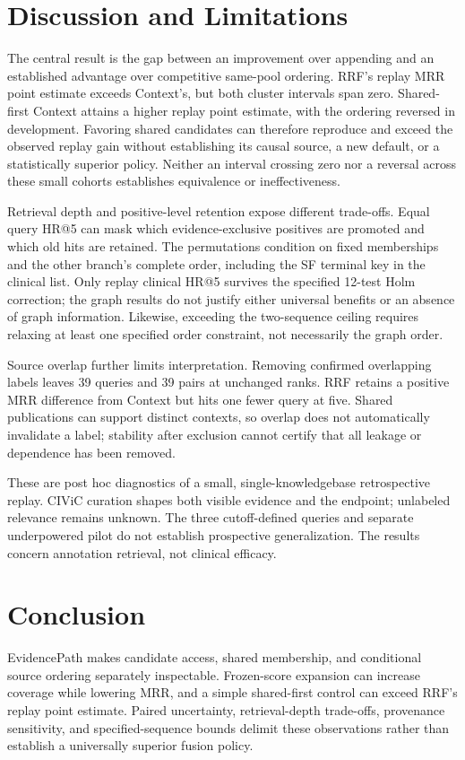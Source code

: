 \section{Discussion and Limitations}
\label{sec:discussion}
The central result is the gap between an improvement over appending and an established advantage over competitive same-pool ordering. RRF's replay MRR point estimate exceeds Context's, but both cluster intervals span zero. Shared-first Context attains a higher replay point estimate, with the ordering reversed in development. Favoring shared candidates can therefore reproduce and exceed the observed replay gain without establishing its causal source, a new default, or a statistically superior policy. Neither an interval crossing zero nor a reversal across these small cohorts establishes equivalence or ineffectiveness.

Retrieval depth and positive-level retention expose different trade-offs. Equal query HR@5 can mask which evidence-exclusive positives are promoted and which old hits are retained. The permutations condition on fixed memberships and the other branch's complete order, including the SF terminal key in the clinical list. Only replay clinical HR@5 survives the specified 12-test Holm correction; the graph results do not justify either universal benefits or an absence of graph information. Likewise, exceeding the two-sequence ceiling requires relaxing at least one specified order constraint, not necessarily the graph order.

Source overlap further limits interpretation. Removing confirmed overlapping labels leaves 39 queries and 39 pairs at unchanged ranks. RRF retains a positive MRR difference from Context but hits one fewer query at five. Shared publications can support distinct contexts, so overlap does not automatically invalidate a label; stability after exclusion cannot certify that all leakage or dependence has been removed.

These are post hoc diagnostics of a small, single-knowledgebase retrospective replay. CIViC curation shapes both visible evidence and the endpoint; unlabeled relevance remains unknown. The three cutoff-defined queries and separate underpowered pilot do not establish prospective generalization. The results concern annotation retrieval, not clinical efficacy.

\section{Conclusion}
EvidencePath makes candidate access, shared membership, and conditional source ordering separately inspectable. Frozen-score expansion can increase coverage while lowering MRR, and a simple shared-first control can exceed RRF's replay point estimate. Paired uncertainty, retrieval-depth trade-offs, provenance sensitivity, and specified-sequence bounds delimit these observations rather than establish a universally superior fusion policy.
